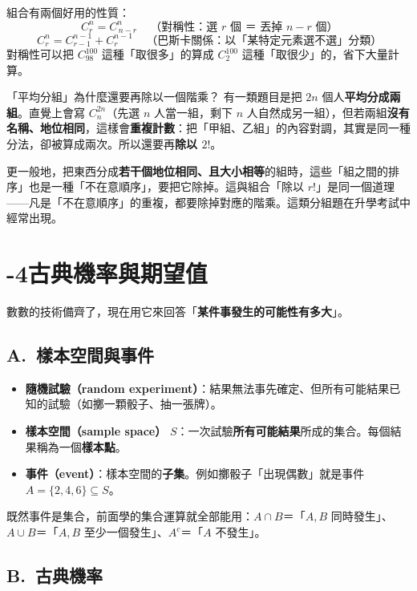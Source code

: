 \documentclass[11pt]{article}
\begin{document}
組合有兩個好用的性質：
$$\boxed{\,C^n_r = C^n_{\,n-r}\,}\quad\text{（對稱性：選 $r$ 個 ＝ 丟掉 $n-r$ 個）}$$
$$\boxed{\,C^n_r = C^{n-1}_{r-1} + C^{n-1}_{r}\,}\quad\text{（巴斯卡關係：以「某特定元素選不選」分類）}$$
對稱性可以把 $C^{100}_{98}$ 這種「取很多」的算成 $C^{100}_{2}$ 這種「取很少」的，省下大量計算。

\begin{延伸框}{「平均分組」為什麼還要再除以一個階乘？}
有一類題目是把 $2n$ 個人\textbf{平均分成兩組}。直覺上會寫 $C^{2n}_n$（先選 $n$ 人當一組，剩下 $n$ 人自然成另一組），但若兩組\textbf{沒有名稱、地位相同}，這樣會\textbf{重複計數}：把「甲組、乙組」的內容對調，其實是同一種分法，卻被算成兩次。所以還要再\textbf{除以 $2!$}。

更一般地，把東西分成\textbf{若干個地位相同、且大小相等}的組時，這些「組之間的排序」也是一種「不在意順序」，要把它除掉。這與組合「除以 $r!$」是同一個道理——凡是「不在意順序」的重複，都要除掉對應的階乘。這類分組題在升學考試中經常出現。
\end{延伸框}

\section*{-4\quad 古典機率與期望值}

數數的技術備齊了，現在用它來回答「\textbf{某件事發生的可能性有多大}」。

\subsection*{\sffamily A.\ 樣本空間與事件}

\begin{itemize}\setlength{\itemsep}{2pt}
\item \textbf{隨機試驗（random experiment）}：結果無法事先確定、但所有可能結果已知的試驗（如擲一顆骰子、抽一張牌）。
\item \textbf{樣本空間（sample space）} $S$：一次試驗\textbf{所有可能結果}所成的集合。每個結果稱為一個\textbf{樣本點}。
\item \textbf{事件（event）}：樣本空間的\textbf{子集}。例如擲骰子「出現偶數」就是事件 $A=\{2,4,6\}\subseteq S$。
\end{itemize}

既然事件是集合，前面學的集合運算就全部能用：$A\cap B$＝「$A,B$ 同時發生」、$A\cup B$＝「$A,B$ 至少一個發生」、$A^c$＝「$A$ 不發生」。

\subsection*{\sffamily B.\ 古典機率}
\end{document}
